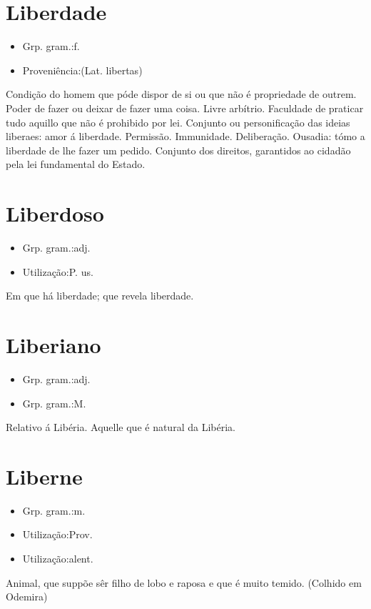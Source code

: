 \section{Liberdade}
\begin{itemize}
\item {Grp. gram.:f.}
\end{itemize}
\begin{itemize}
\item {Proveniência:(Lat. \textunderscore libertas\textunderscore )}
\end{itemize}
Condição do homem que póde dispor de si ou que não é propriedade de outrem.
Poder de fazer ou deixar de fazer uma coisa.
Livre arbítrio.
Faculdade de praticar tudo aquillo que não é prohibido por lei.
Conjunto ou personificação das ideias liberaes: \textunderscore amor á liberdade\textunderscore .
Permissão.
Immunidade.
Deliberação.
Ousadia: \textunderscore tómo a liberdade de lhe fazer um pedido\textunderscore .
Conjunto dos direitos, garantidos ao cidadão pela lei fundamental do Estado.
\section{Liberdoso}
\begin{itemize}
\item {Grp. gram.:adj.}
\end{itemize}
\begin{itemize}
\item {Utilização:P. us.}
\end{itemize}
Em que há liberdade; que revela liberdade.
\section{Liberiano}
\begin{itemize}
\item {Grp. gram.:adj.}
\end{itemize}
\begin{itemize}
\item {Grp. gram.:M.}
\end{itemize}
Relativo á Libéria.
Aquelle que é natural da Libéria.
\section{Liberne}
\begin{itemize}
\item {Grp. gram.:m.}
\end{itemize}
\begin{itemize}
\item {Utilização:Prov.}
\end{itemize}
\begin{itemize}
\item {Utilização:alent.}
\end{itemize}
Animal, que suppõe sêr filho de lobo e raposa e que é muito temido. (Colhido em Odemira)
